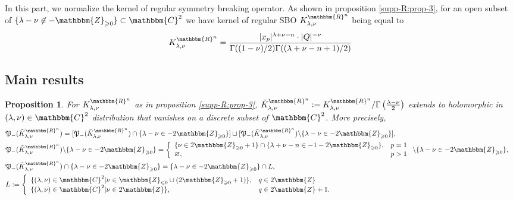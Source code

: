 \documentclass{article}
\newcommand{\assign}{:=}
\newcommand{\nin}{\not\in}
\newcommand{\upl}{+}
\numberwithin{definition}{section}
\numberwithin{lemma}{section}
\newtheorem{proposition}{Proposition}
\numberwithin{proposition}{section}
{\theorembodyfont{\rmfamily}\newtheorem{remark}{Remark}
\numberwithin{remark}{section}
}
\begin{document}
In this part, we normalize the kernel of regular symmetry breaking operator.
As shown in proposition \ref{supp-R:prop-3}, for an open subset of $\{ \lambda
- \nu \nin -\mathbbm{Z}_{\geqslant 0} \} \subset \mathbbm{C}^2$ we have kernel
of regular SBO $K_{\lambda, \nu}^{\mathbbm{R}^n}$ being equal to
\begin{equation}
  K_{\lambda, \nu}^{\mathbbm{R}^n} = \frac{| x_p |^{\lambda + \nu - n} \cdot |
  Q |^{- \nu}}{\Gamma ( ( 1 - \nu) / 2) \Gamma ( ( \lambda + \nu - n \upl 1) /
  2)}
\end{equation}

\subsection{Main results}

\begin{proposition}
  \label{KR-normalization-even:prop-odd}For $K_{\lambda, \nu}^{\mathbbm{R}^n}$
  as in proposition \ref{supp-R:prop-3}, $\tilde{K}_{\lambda,
  \nu}^{\mathbbm{R}^n} \assign K_{\lambda, \nu}^{\mathbbm{R}^n} / \Gamma
  \left( \frac{\lambda - \nu}{2} \right)$ extends to holomorphic in $(
  \lambda, \nu) \in \mathbbm{C}^2$ distribution that vanishes on a discrete
  subset of $\mathbbm{C}^2$. More precisely,
  \begin{eqnarray}
    & \mathfrak{P}_- ( \tilde{K}_{\lambda, \nu}^{\mathbbm{R}^n}) = [
    \mathfrak{P}_- ( \tilde{K}_{\lambda, \nu}^{\mathbbm{R}^n}) \cap \{ \lambda
    - \nu \in - 2\mathbbm{Z}_{\geqslant 0} \}] \sqcup [ \mathfrak{P}_- (
    \tilde{K}_{\lambda, \nu}^{\mathbbm{R}^n}) \backslash \{ \lambda - \nu \in
    - 2\mathbbm{Z}_{\geqslant 0} \}], &  \nonumber\\
    & \mathfrak{P}_- ( \tilde{K}_{\lambda, \nu}^{\mathbbm{R}^n}) \backslash
    \{ \lambda - \nu \in - 2\mathbbm{Z}_{\geqslant 0} \} = \left\{
    \begin{array}{ll}
      \{ \nu \in 2\mathbbm{Z}_{\geqslant 0} + 1 \} \cap \{ \lambda + \nu - n
      \in - 1 - 2\mathbbm{Z}_{\geqslant 0} \}, & p = 1\\
      \varnothing, & p > 1
    \end{array} \right. \backslash \{ \lambda - \nu \in -
    2\mathbbm{Z}_{\geqslant 0} \}, &  \nonumber\\
    & \mathfrak{P}_- ( \tilde{K}_{\lambda, \nu}^{\mathbbm{R}^n}) \cap \{
    \lambda - \nu \in - 2\mathbbm{Z}_{\geqslant 0} \} = \{ \lambda - \nu \in -
    2\mathbbm{Z}_{\geqslant 0} \} \cap L, &  \nonumber\\
    & L \assign \left\{ \begin{array}{ll}
      \{ ( \lambda, \nu) \in \mathbbm{C}^2 | \nu\in\mathbbm{Z}_{\leqslant 0} \cup (
      2\mathbbm{Z}_{\geqslant 0} + 1) \}, & q \in 2\mathbbm{Z}\\
      \{ ( \lambda, \nu) \in \mathbbm{C}^2 | \nu \in 2\mathbbm{Z} \}, & q \in
      2\mathbbm{Z}+ 1.
    \end{array} \right. &  \nonumber
  \end{eqnarray}
\end{proposition}
\end{document}
